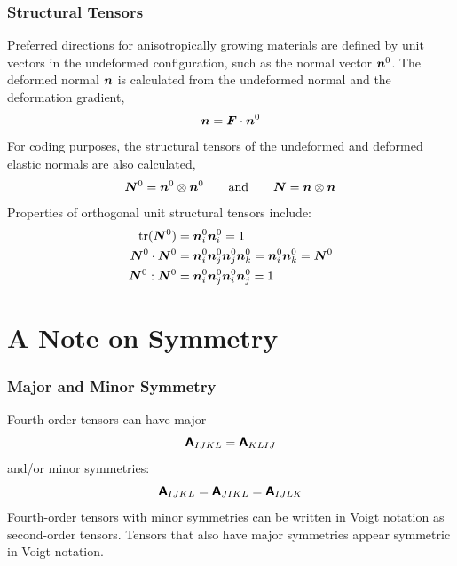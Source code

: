 \documentclass[10pt,letterpaper,oneside]{report}
\newcommand{\ten}[1]{\mbox{\boldmath $#1$}{}}
\newcommand{\tenf}[1]{\mbox{{\sffamily{\bfseries {#1}}}}}
\begin{document}
\subsection{Structural Tensors}
Preferred directions for anisotropically growing materials are defined by unit vectors in the undeformed configuration, such as the normal vector $\ten{n}^0$.  The deformed normal $\ten{n}$ is calculated from the undeformed normal and the deformation gradient,
\begin{equation}
\ten{n} = \ten{F} \cdot \ten{n}^0
\end{equation}
For coding purposes, the structural tensors of the undeformed and deformed elastic normals are also calculated, 
\begin{equation}
\ten{N}^0 = \ten{n}^0 \otimes \ten{n}^0 
\qquad \mbox{and} \qquad 
\ten{N} = \ten{n} \otimes \ten{n}
\end{equation}
Properties of orthogonal unit structural tensors include:
\begin{align}
\mbox{tr} (\ten{N}^0) ={}& \ten{n}^0_i \ten{n}^0_i = 1 \\
\ten{N}^0 \cdot \ten{N}^0 ={}& \ten{n}^0_i \ten{n}^0_j \ten{n}^0_j \ten{n}^0_k = \ten{n}^0_i \ten{n}^0_k = \ten{N}^0 \\
\ten{N}^0 : \ten{N}^0 ={}& \ten{n}^0_i \ten{n}^0_j \ten{n}^0_i \ten{n}^0_j = 1
\end{align}

\chapter{A Note on Symmetry}

\subsection{Major and Minor Symmetry}
\label{sec:symmetry}
Fourth-order tensors can have major 
\begin{equation}
\tenf{A}_{IJKL} = \tenf{A}_{KLIJ} 
\end{equation}
and/or minor symmetries:
\begin{equation}
\tenf{A}_{IJKL} = \tenf{A}_{JIKL} = \tenf{A}_{IJLK} 
\end{equation}
Fourth-order tensors with minor symmetries can be written in Voigt notation as second-order tensors.  Tensors that also have major symmetries appear symmetric in Voigt notation.  
\end{document}
